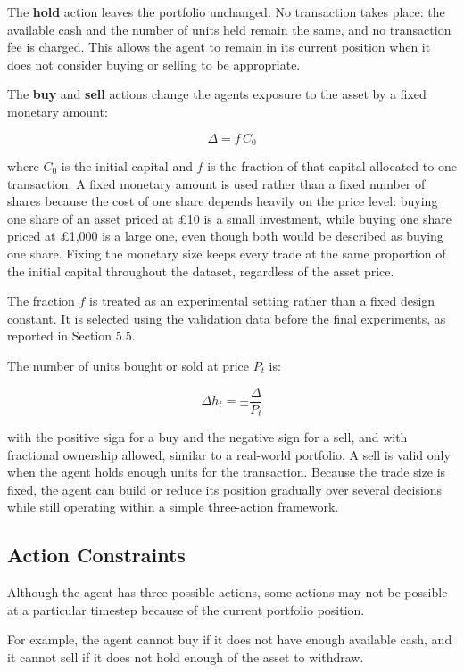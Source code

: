 The \textbf{hold} action leaves the portfolio unchanged. No transaction
takes place: the available cash and the number of units held remain the
same, and no transaction fee is charged. This allows the agent to remain
in its current position when it does not consider buying or selling to
be appropriate.

The \textbf{buy} and \textbf{sell} actions change the
agent\textquotesingle s exposure to the asset by a fixed monetary
amount:

\[\Delta = f\,C_{0}\]

where \(C_{0}\) is the initial capital and \(f\) is the fraction of that
capital allocated to one transaction. A fixed monetary amount is used
rather than a fixed number of shares because the cost of one share
depends heavily on the price level: buying one share of an asset priced
at \pounds 10 is a small investment, while buying one share priced at
\pounds 1,000 is a large one, even though both would be described as
buying one share. Fixing the monetary size keeps every trade at the same
proportion of the initial capital throughout the dataset, regardless of
the asset price.

The fraction \(f\) is treated as an experimental setting rather than a
fixed design constant. It is selected using the validation data before
the final experiments, as reported in Section 5.5.

The number of units bought or sold at price \(P_{t}\) is:

\[\Delta h_{t} = \pm\frac{\Delta}{P_{t}}\]

with the positive sign for a buy and the negative sign for a sell, and
with fractional ownership allowed, similar to a real-world portfolio. A
sell is valid only when the agent holds enough units for the transaction.
Because the trade size is fixed, the agent can build or reduce its
position gradually over several decisions while still operating within a
simple three-action framework.

\subsection{Action Constraints}

Although the agent has three possible actions, some actions may not be
possible at a particular timestep because of the current portfolio
position.

For example, the agent cannot buy if it does not have enough available
cash, and it cannot sell if it does not hold enough of the asset to
withdraw.

